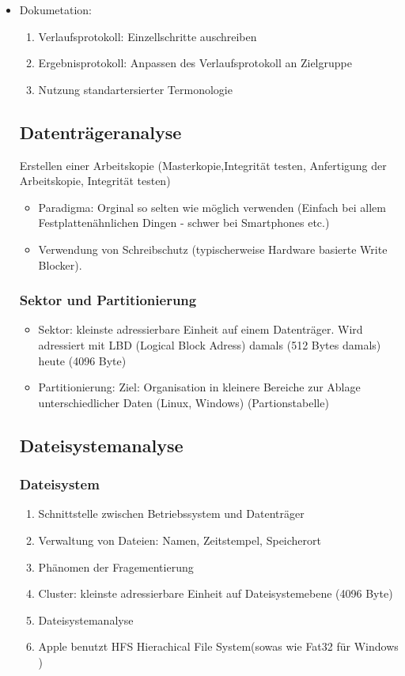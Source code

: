 \documentclass[a4paper,10pt]{scrartcl}
\begin{document}
\begin{itemize}
\item Dokumetation:
\begin{enumerate}
 \item Verlaufsprotokoll: Einzellschritte auschreiben
 \item Ergebnisprotokoll: Anpassen des Verlaufsprotokoll an Zielgruppe
 \item Nutzung standartersierter Termonologie
\end{enumerate}

\subsection{Datenträgeranalyse}

Erstellen einer Arbeitskopie (Masterkopie,Integrität testen, Anfertigung der Arbeitskopie, Integrität testen)
\begin{itemize}
 \item Paradigma: Orginal so selten wie möglich verwenden (Einfach bei allem Festplattenähnlichen Dingen - schwer bei Smartphones etc.)
 \item Verwendung von Schreibschutz (typischerweise Hardware basierte Write Blocker).
\end{itemize}

\subsubsection{Sektor und Partitionierung}
\begin{itemize}
 \item Sektor: kleinste adressierbare Einheit auf einem Datenträger. Wird adressiert mit LBD (Logical Block Adress) damals (512 Bytes damals) heute (4096 Byte)
 \item Partitionierung: Ziel: Organisation in kleinere Bereiche zur Ablage unterschiedlicher Daten (Linux, Windows) (Partionstabelle)
\end{itemize}
\subsection{Dateisystemanalyse}


\subsubsection{Dateisystem}
\begin{enumerate}
 \item Schnittstelle zwischen Betriebssystem und Datenträger
 \item Verwaltung von Dateien: Namen, Zeitstempel, Speicherort
 \item Phänomen der Fragementierung
 \item Cluster: kleinste adressierbare Einheit auf Dateisystemebene (4096 Byte)
 \item Dateisystemanalyse
 \item Apple benutzt HFS Hierachical File System(sowas wie Fat32 für Windows )
\end{enumerate}


\end{itemize}




 
\end{document}
